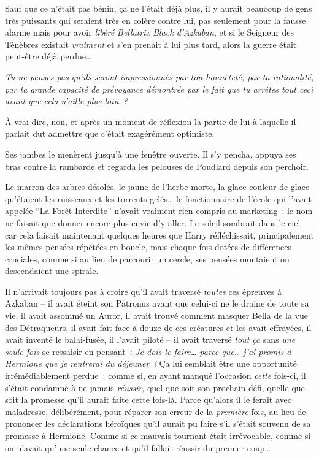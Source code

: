 Sauf que ce n'était pas bénin, ça ne l'était déjà plus, il y aurait beaucoup de gens très puissants qui seraient très en colère contre lui, pas seulement pour la fausse alarme mais pour avoir \emph{libéré Bellatrix Black d'Azkaban}, et si le Seigneur des Ténèbres existait \emph{vraiment} et s'en prenait à lui plus tard, alors la guerre était peut-être déjà perdue…

\emph{Tu ne penses pas qu'ils seront impressionnés par ton honnêteté, par ta rationalité, par ta grande capacité de prévoyance démontrée par le fait que tu arrêtes tout ceci avant que cela n'aille plus loin~?}

À vrai dire, non, et après un moment de réflexion la partie de lui à laquelle il parlait dut admettre que c'était exagérément optimiste.

Ses jambes le menèrent jusqu'à une fenêtre ouverte. Il s'y pencha, appuya ses bras contre la rambarde et regarda les pelouses de Poudlard depuis son perchoir.

Le marron des arbres désolés, le jaune de l'herbe morte, la glace couleur de glace qu'étaient les ruisseaux et les torrents gelés… le fonctionnaire de l'école qui l'avait appelée “La Forêt Interdite” n'avait vraiment rien compris au marketing~: le nom ne faisait que donner encore plus envie d'y aller. Le soleil sombrait dans le ciel car cela faisait maintenant quelques heures que Harry réfléchissait, principalement les mêmes pensées répétées en boucle, mais chaque fois dotées de différences cruciales, comme si au lieu de parcourir un cercle, ses pensées montaient ou descendaient une spirale.

Il n'arrivait toujours pas à croire qu'il avait traversé \emph{toutes} ces épreuves à Azkaban -- il avait éteint son Patronus avant que celui-ci ne le draine de toute sa vie, il avait assommé un Auror, il avait trouvé comment masquer Bella de la vue des Détraqueurs, il avait fait face à douze de ces créatures et les avait effrayées, il avait inventé le balai-fusée, il l'avait piloté -- il avait traversé \emph{tout ça} sans \emph{une seule fois} se ressaisir en pensant~: \emph{Je dois le faire… parce que… j'ai promis à Hermione que je rentrerai du déjeuner~!} Ça lui semblait être une opportunité irrémédiablement perdue~; comme si, en ayant manqué l'occasion \emph{cette} fois-ci, il s'était condamné à ne jamais \emph{réussir}, quel que soit son prochain défi, quelle que soit la promesse qu'il aurait faite cette fois-là. Parce qu'alors il le ferait avec maladresse, délibérément, pour réparer son erreur de la \emph{première} fois, au lieu de prononcer les déclarations héroïques qu'il aurait pu faire s'il s'était souvenu de sa promesse à Hermione. Comme si ce mauvais tournant était irrévocable, comme si on n'avait qu'une seule chance et qu'il fallait réussir du premier coup…

